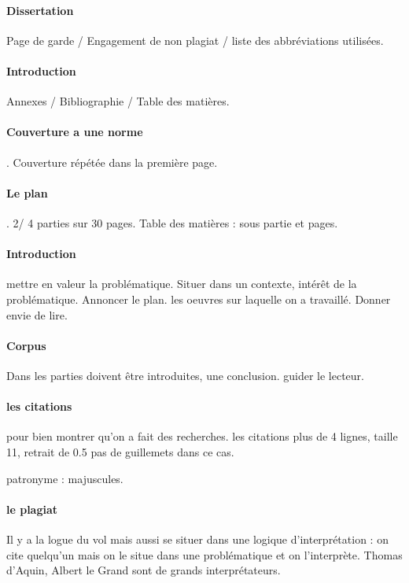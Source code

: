 \paragraph{Dissertation} Page de garde / Engagement de non plagiat / liste des abbréviations utilisées. 

\paragraph{Introduction} Annexes / Bibliographie / Table des matières. 

\paragraph{Couverture a une norme}. Couverture répétée dans la première page. 

\paragraph{Le plan}. 2/ 4 parties sur 30 pages. Table des matières : sous partie et pages.

\paragraph{Introduction} mettre en valeur la problématique. Situer dans un contexte, intérêt de la problématique. Annoncer le plan. les oeuvres sur laquelle on a travaillé. Donner envie de lire.

\paragraph{Corpus} Dans les parties doivent être introduites, une conclusion. guider le lecteur. 

\paragraph{les citations} pour bien montrer qu'on a fait des recherches. les citations plus de 4 lignes, taille 11, retrait de 0.5 pas de guillemets dans ce cas. 

patronyme : majuscules. 

\paragraph{le plagiat} Il y a la logue du vol mais aussi se situer dans une logique d'interprétation : on cite quelqu'un mais on le situe dans une problématique et on l'interprète.  Thomas d'Aquin, Albert le Grand sont de grands interprétateurs. 


